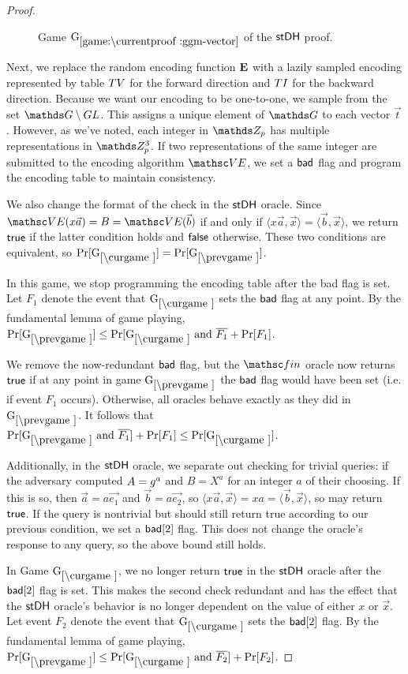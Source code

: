 \begin{proof}
\begin{figure}[tp]
	\caption[]{%
		Game $\lblGm{ggm-vector}$ of the $\mathsf{stDH}$ proof.
	}
	\label{fig:GGM-proof:game:vector}
\end{figure}

Next, we replace the random encoding function $\mathbf{E}$ with a lazily sampled encoding represented by table $TV$ for the forward direction and $TI$ for the backward direction. Because we want our encoding to be one-to-one, we sample from the set $\group\setminus \GL$. This assigns a unique element of $\group$ to each vector $\vec{t}$. However, as we've noted, each integer in $\ZZ_p$ has multiple representations in $\ZZ_p^3$. If two representations of the same integer are submitted to the encoding algorithm $\VE$, we set a $\mathsf{bad}$ flag and program the encoding table to maintain consistency.

We also change the format of the check in the $\mathsf{stDH}$ oracle. Since $\VE(x\vec{a}) = B = \VE(\vec{b})$ if and only if $\langle x \vec{a}, \vec{x} \rangle = \langle \vec{b}, \vec{x} \rangle$, we return $\mathsf{true}$ if the latter condition holds and $\mathsf{false}$ otherwise.  These two conditions are equivalent, so 
$\Pr[\curGm*] = \Pr[\prevGm*]$.

In this game, we stop programming the encoding table after the bad flag is set. Let $F_1$ denote the event that $\curGm*$ sets the $\mathsf{bad}$ flag at any point. 
By the fundamental lemma of game playing, $\Pr[\prevGm*] \leq  \Pr[\curGm*\text{ and }\overline{F_1} + \Pr[F_1]$. 

We remove the now-redundant $\mathsf{bad}$ flag, but the $\Finalize$ oracle now returns $\mathsf{true}$ if at any point in game $\prevGm*$ the $\mathsf{bad}$ flag would have been set (i.e. if event $F_1$ occurs). Otherwise, all oracles behave exactly as they did in $\prevGm*$. It follows that 
$\Pr[\prevGm* \text{ and } \overline{F_1}] + \Pr[F_1] \leq \Pr[\curGm*]$.

Additionally, in the $\mathsf{stDH}$ oracle, we separate out checking for trivial queries: if the adversary computed $A = g^a$ and $B = X^a$ for an integer $a$ of their choosing. If this is so, then $\vec{a} = a \vec{e_1}$ and $\vec{b} = a \vec{e_2}$, so $\langle x \vec{a}, \vec{x} \rangle = x a = \langle \vec{b},\vec{x} \rangle$, so may return $\mathsf{true}$. If the query is nontrivial but should still return true according to our previous condition, we set a $\mathsf{bad}[2]$ flag. This does not change the oracle's response to any query, so the above bound still holds. 

In Game $\curGm*$, we no longer return  $\mathsf{true}$ in the $\mathsf{stDH}$ oracle after the $\mathsf{bad}[2]$ flag is set. This makes the second check redundant and has the effect that the $\mathsf{stDH}$ oracle's behavior is no longer dependent on the value of either $x$ or $\vec{x}$. Let event $F_2$ denote the event that $\curGm*$ sets the $\mathsf{bad}[2]$ flag. By the fundamental lemma of game playing, $\Pr[\prevGm*]\leq \Pr[\curGm* \text{ and } \overline{F_2}] + \Pr[F_2]$. 



\end{proof}
